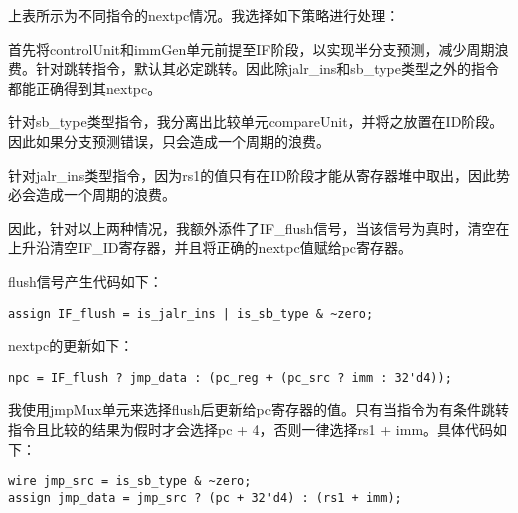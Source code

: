 \documentclass{article}
\begin{document}
        \par{}
        上表所示为不同指令的nextpc情况。我选择如下策略进行处理：
        \par{}
        首先将controlUnit和immGen单元前提至IF阶段，以实现半分支预测，减少周期浪费。针对跳转指令，默认其必定跳转。因此除jalr\_ins和sb\_type类型之外的指令都能正确得到其nextpc。
        \par{}
        针对sb\_type类型指令，我分离出比较单元compareUnit，并将之放置在ID阶段。因此如果分支预测错误，只会造成一个周期的浪费。
        \par{}
        针对jalr\_ins类型指令，因为rs1的值只有在ID阶段才能从寄存器堆中取出，因此势必会造成一个周期的浪费。
        \par{}
        因此，针对以上两种情况，我额外添件了IF\_flush信号，当该信号为真时，清空在上升沿清空IF\_ID寄存器，并且将正确的nextpc值赋给pc寄存器。
        \par{}
        flush信号产生代码如下：
        \begin{verbatim}
assign IF_flush = is_jalr_ins | is_sb_type & ~zero;
        \end{verbatim}
        \par{}
        nextpc的更新如下：
        \begin{verbatim}
npc = IF_flush ? jmp_data : (pc_reg + (pc_src ? imm : 32'd4));
        \end{verbatim}
        \par{}
        我使用jmpMux单元来选择flush后更新给pc寄存器的值。只有当指令为有条件跳转指令且比较的结果为假时才会选择pc + 4，否则一律选择rs1 + imm。具体代码如下：
        \begin{verbatim}
wire jmp_src = is_sb_type & ~zero;
assign jmp_data = jmp_src ? (pc + 32'd4) : (rs1 + imm);
        \end{verbatim}
\end{document}
